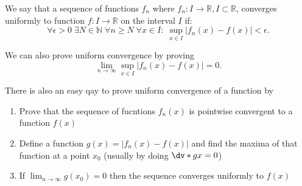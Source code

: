 \begin{definition}
	We say that a sequence of functions $f_n$ where $f_n:I \to \mathbb{R},I\subset \mathbb{R}$, converges uniformly to function $f:I\to \mathbb{R}$ on the interval $I$ if:
	\[
		\forall \epsilon>0\;\exists N\in\mathbb{N}\;\forall n\ge N\;\forall x\in I: \; \sup_{x\in I} \left| f_n(x)-f(x) \right| <\epsilon
		.\]
\end{definition}

\begin{remark}
	We can also prove uniform convergence by proving
	\[
		\lim_{n \to \infty}\sup_{x\in I} \left| f_n(x)-f(x) \right|=0
		.\]
\end{remark}

There is also an easy qay to prove uniform convergence of a function by
\begin{enumerate}
	\item Prove that the sequence of fucntions $f_n(x)$ is pointwise convergent to a function $f(x)$ 
	\item Define a function $g(x)=|f_n(x)-f(x)|$ and find the maxima of that function at a point $x_0$ (usually by doing $\dv*{g}{x} =0$)
	\item If $\lim_{n \to \infty}g(x_0)=0 $ then the sequence converges uniformly to $f(x)$
\end{enumerate}



